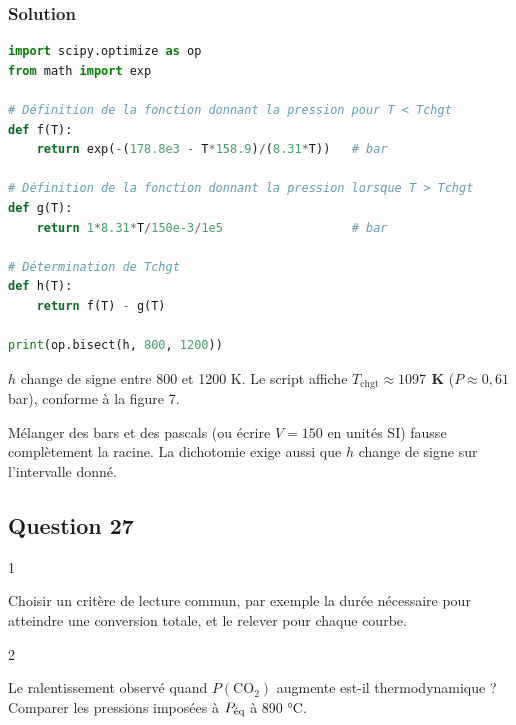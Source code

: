 \documentclass[11pt,a4paper]{article}
\begin{document}
\hypertarget{solution-25}{%
\subsubsection{Solution}\label{solution-25}}

\begin{lstlisting}[language=Python]
import scipy.optimize as op
from math import exp

# Définition de la fonction donnant la pression pour T < Tchgt
def f(T):
    return exp(-(178.8e3 - T*158.9)/(8.31*T))   # bar

# Définition de la fonction donnant la pression lorsque T > Tchgt
def g(T):
    return 1*8.31*T/150e-3/1e5                  # bar

# Détermination de Tchgt
def h(T):
    return f(T) - g(T)

print(op.bisect(h, 800, 1200))
\end{lstlisting}

\(h\) change de signe entre 800 et 1200 K. Le script affiche \textbf{\(T_{\text{chgt}}\approx1097\) K} (\(P\approx0{,}61\) bar), conforme à la figure 7.

\begin{piege}

Mélanger des bars et des pascals (ou écrire \(V=150\) en unités SI) fausse complètement la racine. La dichotomie exige aussi que \(h\) change de signe sur l'intervalle donné.

\end{piege}

\hypertarget{question-27}{%
\subsection{Question 27}\label{question-27}}

\begin{indication}{1}

Choisir un critère de lecture commun, par exemple la durée nécessaire pour atteindre une conversion totale, et le relever pour chaque courbe.

\end{indication}

\begin{indication}{2}

Le ralentissement observé quand \(P(\mathrm{CO_2})\) augmente est-il thermodynamique ? Comparer les pressions imposées à \(P_{\text{\text{éq}}}\) à 890 °C.

\end{indication}
\end{document}

